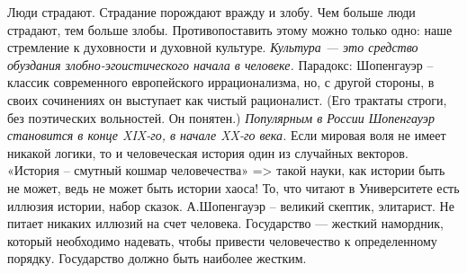 \documentclass[12pt]{article}
\begin{document}
Люди  страдают.  Страдание  порождают  вражду  и  злобу.  Чем  больше  люди  страдают,  тем  больше  злобы.
Противопоставить этому можно только одно: наше стремление к духовности и духовной культуре. 
\textit{Культура --- это средство обуздания злобно-эгоистического начала в человеке.}
Парадокс: Шопенгауэр – классик современного европейского иррационализма, но, с другой стороны, в своих
сочинениях он выступает как чистый рационалист. (Его трактаты строги, без поэтических вольностей. Он
понятен.) \textit{Популярным в России Шопенгауэр становится в конце XIX-го, в начале XX-го века.}
Если мировая воля не имеет никакой логики, то и человеческая история один из случайных векторов. «История
– смутный кошмар человечества» => такой науки, как истории быть не может, ведь не может быть истории
хаоса! То, что читают в Университете есть иллюзия истории, набор сказок.
А.Шопенгауэр – великий скептик, элитарист. Не питает никаких иллюзий на счет человека. Государство ---
жесткий намордник, который необходимо надевать, чтобы привести человечество к определенному порядку.
Государство должно быть наиболее жестким.

\newpage
\end{document}
